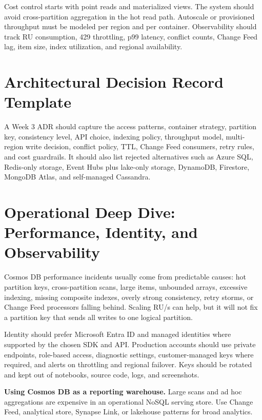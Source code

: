 Cost control starts with point reads and materialized views. The system should avoid cross-partition aggregation in the hot read path. Autoscale or provisioned throughput must be modeled per region and per container. Observability should track RU consumption, 429 throttling, p99 latency, conflict counts, Change Feed lag, item size, index utilization, and regional availability.

\section{Architectural Decision Record Template}
A Week 3 ADR should capture the access patterns, container strategy, partition key, consistency level, API choice, indexing policy, throughput model, multi-region write decision, conflict policy, TTL, Change Feed consumers, retry rules, and cost guardrails. It should also list rejected alternatives such as Azure SQL, Redis-only storage, Event Hubs plus lake-only storage, DynamoDB, Firestore, MongoDB Atlas, and self-managed Cassandra.

\section{Operational Deep Dive: Performance, Identity, and Observability}
Cosmos DB performance incidents usually come from predictable causes: hot partition keys, cross-partition scans, large items, unbounded arrays, excessive indexing, missing composite indexes, overly strong consistency, retry storms, or Change Feed processors falling behind. Scaling RU/s can help, but it will not fix a partition key that sends all writes to one logical partition.

Identity should prefer Microsoft Entra ID and managed identities where supported by the chosen SDK and API. Production accounts should use private endpoints, role-based access, diagnostic settings, customer-managed keys where required, and alerts on throttling and regional failover. Keys should be rotated and kept out of notebooks, source code, logs, and screenshots.

\begin{pitfall}
\textbf{Using Cosmos DB as a reporting warehouse.} Large scans and ad hoc aggregations are expensive in an operational NoSQL serving store. Use Change Feed, analytical store, Synapse Link, or lakehouse patterns for broad analytics.
\end{pitfall}

